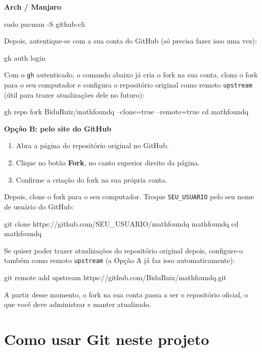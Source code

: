 \documentclass[11pt,a4paper]{article}
\begin{document}
\textbf{Arch / Manjaro}
\begin{terminal}
sudo pacman -S github-cli
\end{terminal}

Depois, autentique-se com a sua conta do GitHub (só precisa fazer isso uma vez):

\begin{terminal}
gh auth login
\end{terminal}

Com o \texttt{gh} autenticado, o comando abaixo já cria o fork na sua conta, clona o fork para o seu
computador e configura o repositório original como remoto \texttt{upstream} (útil para trazer atualizações
dele no futuro):

\begin{terminal}
gh repo fork BiduRuiz/mathfoundq --clone=true --remote=true
cd mathfoundq
\end{terminal}

\textbf{Opção B: pelo site do GitHub}

\begin{enumerate}
  \item Abra a página do repositório original no GitHub.
  \item Clique no botão \textbf{Fork}, no canto superior direito da página.
  \item Confirme a criação do fork na sua própria conta.
\end{enumerate}

Depois, clone o fork para o seu computador. Troque \texttt{SEU\_USUARIO} pelo seu nome de usuário do GitHub:

\begin{terminal}
git clone https://github.com/SEU_USUARIO/mathfoundq mathfoundq
cd mathfoundq
\end{terminal}

Se quiser poder trazer atualizações do repositório original depois, configure-o também como remoto
\texttt{upstream} (a Opção A já faz isso automaticamente):

\begin{terminal}
git remote add upstream https://github.com/BiduRuiz/mathfoundq.git
\end{terminal}

A partir desse momento, o fork na sua conta passa a ser o repositório oficial, o que você deve administrar
e manter atualizado.

\section{Como usar Git neste projeto}
\end{document}
